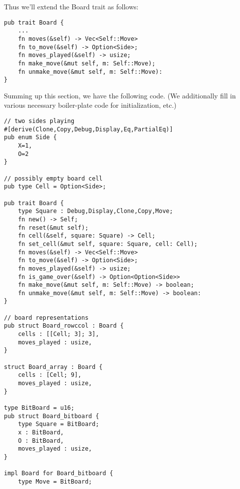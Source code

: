 \documentclass[10pt,dvipdfmx]{report}
\begin{document}
Thus we'll extend the Board trait as follows:
{\scriptsize
\begin{verbatim}
pub trait Board {
    ...
    fn moves(&self) -> Vec<Self::Move>
    fn to_move(&self) -> Option<Side>;
    fn moves_played(&self) -> usize;
    fn make_move(&mut self, m: Self::Move);
    fn unmake_move(&mut self, m: Self::Move):
}
\end{verbatim}
}

Summing up this section, we have the following code.
(We additionally fill in various necessary boiler-plate code for initialization, etc.)
{\scriptsize
\begin{verbatim}
// two sides playing
#[derive(Clone,Copy,Debug,Display,Eq,PartialEq)]
pub enum Side {
    X=1,
    O=2
}

// possibly empty board cell
pub type Cell = Option<Side>;

pub trait Board {
    type Square : Debug,Display,Clone,Copy,Move;
    fn new() -> Self;
    fn reset(&mut self);
    fn cell(&self, square: Square) -> Cell;
    fn set_cell(&mut self, square: Square, cell: Cell);
    fn moves(&self) -> Vec<Self::Move>
    fn to_move(&self) -> Option<Side>;
    fn moves_played(&self) -> usize;
    fn is_game_over(&self) -> Option<Option<Side>>
    fn make_move(&mut self, m: Self::Move) -> boolean;
    fn unmake_move(&mut self, m: Self::Move) -> boolean:
}

// board representations
pub struct Board_rowccol : Board {
    cells : [[Cell; 3]; 3],
    moves_played : usize,
}

struct Board_array : Board {
    cells : [Cell; 9],
    moves_played : usize,
}

type BitBoard = u16;
pub struct Board_bitboard {
    type Square = BitBoard;
    x : BitBoard,
    O : BitBoard,
    moves_played : usize,
}

impl Board for Board_bitboard {
    type Move = BitBoard;


\end{verbatim}}
\end{document}
